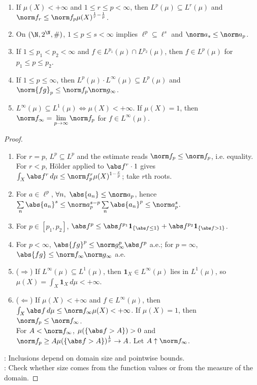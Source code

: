 \begin{proposition} \label{prop:lp-inclusions-interpolation-and-multipliers} 
\begin{enumerate}[label=(\roman*)]
\setlength{\itemsep}{0pt}
\item If $\mu(X)<+\infty$ and $1\leq r\leq p<\infty$, then $L^p(\mu)\subseteq L^r(\mu)$ and $\norm f_r\leq\norm f_p\mu(X)^{\frac{1}{r}-\frac{1}{p}}$.
\item On $(\N,2^\N,\#)$, $1\leq p\leq s<\infty$ implies $\ell^p\subseteq\ell^s$ and $\norm a_s\leq\norm a_p$.
\item If $1\leq p_1<p_2<\infty$ and $f\in L^{p_1}(\mu)\cap L^{p_2}(\mu)$, then $f\in L^p(\mu)$ for $p_1\leq p\leq p_2$.
\item If $1\leq p\leq\infty$, then $L^p(\mu)\cdot L^\infty(\mu)\subseteq L^p(\mu)$ and $\norm{fg}_p\leq\norm f_p\norm g_\infty$.
\item $L^\infty(\mu)\subseteq L^1(\mu)\Longleftrightarrow\mu(X)<+\infty$. If $\mu(X)=1$, then $\norm f_\infty=\lim\limits_{p\to\infty}\norm f_p$ for $f\in L^\infty(\mu)$.
\end{enumerate}
\begin{proof}
\begin{enumerate}[label=(\roman*)]
\setlength{\itemsep}{0pt}
\item For $r=p$, $L^p\subseteq L^p$ and the estimate reads $\norm f_p\leq\norm f_p$, i.e. equality.\\
For $r<p$, H\"older applied to $\abs f^r\cdot1$ gives $\int_X\abs f^r\,d\mu\leq\norm f_p^r\mu(X)^{1-\frac{r}{p}}$; take $r$th roots.
\item For $a\in\ell^p$, $\forall n,\ \abs{a_n}\leq\norm a_p$, hence $\sum\limits_n\abs{a_n}^s\leq\norm a_p^{s-p}\sum\limits_n\abs{a_n}^p\leq\norm a_p^s$.
\item For $p\in[p_1,p_2]$, $\abs f^p\leq\abs f^{p_1}\mathbf 1_{\{\abs f\leq1\}}+\abs f^{p_2}\mathbf 1_{\{\abs f>1\}}$.
\item For $p<\infty$, $\abs{fg}^p\leq\norm g_\infty^p\abs f^p$ a.e.; for $p=\infty$, $\abs{fg}\leq\norm f_\infty\norm g_\infty$ a.e.
\item[$(v)$]($\Rightarrow$) If $L^\infty(\mu)\subseteq L^1(\mu)$, then $\mathbf 1_X\in L^\infty(\mu)$ lies in $L^1(\mu)$, so $\mu(X)=\int_X\mathbf 1_X\,d\mu<+\infty$.
\item[$(v)$]($\Leftarrow$) If $\mu(X)<+\infty$ and $f\in L^\infty(\mu)$, then $\int_X\abs f\,d\mu\leq\norm f_\infty\mu(X)<+\infty$. If $\mu(X)=1$, then $\norm f_p\leq\norm f_\infty$.\\
For $A<\norm f_\infty$, $\mu(\{\abs f>A\})>0$ and $\norm f_p\geq A\mu(\{\abs f>A\})^{\frac{1}{p}}\to A$. Let $A\uparrow\norm f_\infty$.
\end{enumerate}
: Inclusions depend on domain size and pointwise bounds.\\
: Check whether size comes from the function values or from the measure of the domain.
\end{proof}
\end{proposition}

